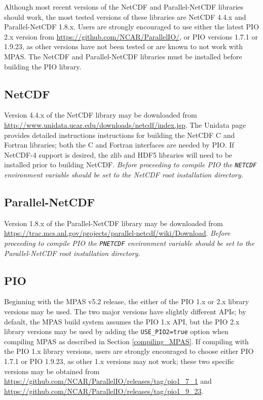 Although most recent versions of the NetCDF and Parallel-NetCDF libraries should work,
the most tested versions of these libraries are NetCDF 4.4.x and Parallel-NetCDF 1.8.x.
Users are strongly encouraged to use either the latest PIO 2.x version from \url{https://github.com/NCAR/ParallelIO/},
or PIO versions 1.7.1 or 1.9.23, as other versions have not been tested or are known to not work with MPAS.
The NetCDF and Parallel-NetCDF libraries must be installed before building the PIO library.

\subsection{NetCDF}
\label{serial_netcdf}

Version 4.4.x of the NetCDF library may be downloaded from
\url{http://www.unidata.ucar.edu/downloads/netcdf/index.jsp}.
The Unidata page provides detailed instructions instructions for building the NetCDF C and Fortran libraries;
both the C and Fortran interfaces are needed by PIO. If NetCDF-4 support is desired, the zlib and HDF5 libraries
will need to be installed prior to building NetCDF. {\em Before proceeding to compile PIO
the {\tt NETCDF} environment variable should be set to the NetCDF root
installation directory.}

\subsection{Parallel-NetCDF}
\label{parallel_netcdf}

Version 1.8.x of the Parallel-NetCDF library may be downloaded from
\url{https://trac.mcs.anl.gov/projects/parallel-netcdf/wiki/Download}. {\em Before proceeding to
compile PIO the {\tt PNETCDF} environment variable should be set to the
Parallel-NetCDF root installation directory.}

\subsection{PIO}
\label{pio_build}

Beginning with the MPAS v5.2 release, the either of the PIO 1.x or 2.x library versions
may be used. The two major versions have slightly different APIs; by default, the MPAS build
system assumes the PIO 1.x API, but the PIO 2.x library versions may be used by
adding the {\tt USE\_PIO2=true} option when compiling MPAS as described in Section \ref{compiling_MPAS}.
If compiling with the PIO 1.x library versions, users are strongly encouraged to choose
either PIO 1.7.1 or PIO 1.9.23, as other 1.x versions may not work; these two specific versions may
be obtained from \url{https://github.com/NCAR/ParallelIO/releases/tag/pio1_7_1} and
\url{https://github.com/NCAR/ParallelIO/releases/tag/pio1_9_23}.

